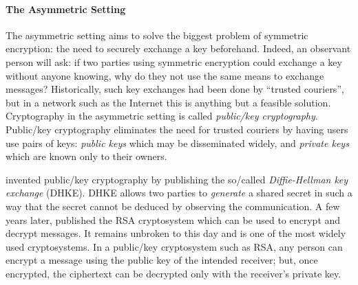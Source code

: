 \documentclass[version=last, paper=A4, parskip=half, oneside]{scrbook}
\theoremstyle{plain}
\theoremstyle{definition}
\theoremstyle{remark}
\newcommand*{\enc}{\ensuremath{\mathsf{Enc}}}
\newcommand*{\dec}{\ensuremath{\mathsf{Dec}}}
\begin{document}
\begin{figure}
  \centering
  \label{fig:symmetric-setting}
\end{figure}

\paragraph{The Asymmetric Setting} The asymmetric setting aims to solve the
biggest problem of symmetric encryption: the need to securely exchange a key
beforehand.  Indeed, an observant person will ask: if two parties using
symmetric encryption could exchange a key without anyone knowing, why do they
not use the same means to exchange messages?  Historically, such key exchanges
had been done by \enquote{trusted couriers}, but in a network such as the
Internet this is anything but a feasible solution.  Cryptography in the
asymmetric setting is called \emph{public\-/key cryptography}.  Public\-/key
cryptography eliminates the need for trusted couriers by having users use pairs
of keys: \emph{public keys} which may be disseminated widely, and \emph{private
  keys} which are known only to their owners.

\Textcite{DH76} invented public\-/key cryptography by publishing the so\-/called
\emph{Diffie\--Hellman key exchange} (DHKE).  DHKE allows two parties to
\emph{generate} a shared secret in such a way that the secret cannot be deduced
by observing the communication.  A few years later, \textcite{RSA78} published
the RSA cryptosystem which can be used to encrypt and decrypt messages.  It
remains unbroken to this day and is one of the most widely used cryptosystems.
In a public\-/key cryptosystem such as RSA, any person can encrypt a message
using the public key of the intended receiver; but, once encrypted, the
ciphertext can be decrypted only with the receiver's private key.
\end{document}
